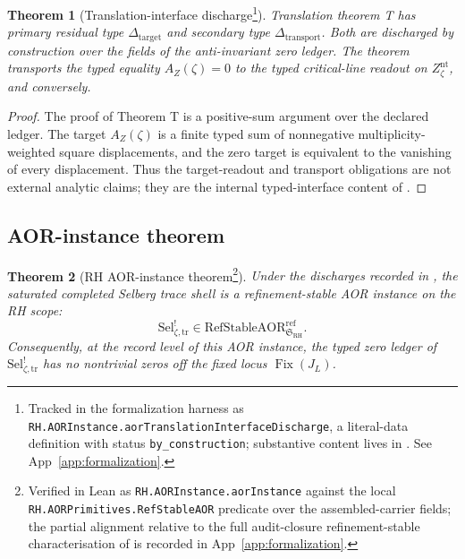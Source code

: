 \documentclass[11pt]{article}
\DeclareMathOperator{\Fix}{Fix}
\newcommand{\JL}{J_{L}}
\newcommand{\Znt}{Z_{\zeta}^{\mathrm{nt}}}
\newcommand{\AZ}{A_{Z}(\zeta)}
\newcommand{\Sel}{\mathrm{Sel}^{!}_{\zeta,\mathrm{tr}}}
\newtheorem{theorem}{Theorem}[section]
\theoremstyle{definition}
\begin{document}
\begin{theorem}[Translation-interface discharge\footnote{Tracked in the formalization harness as \nolinkurl{RH.AORInstance.aorTranslationInterfaceDischarge}, a literal-data definition with status \texttt{by\_construction}; substantive content lives in . See App~\ref{app:formalization}.}]
\label{thm:rh:aor-translation-interface-discharge}
Translation theorem T has primary residual type
\(\Delta_{\mathrm{target}}\) and secondary type
\(\Delta_{\mathrm{transport}}\).  Both are discharged by construction
over the fields of the anti-invariant zero ledger.  The theorem
transports the typed equality \(\AZ=0\) to the typed critical-line
readout on \(\Znt\), and conversely.
\end{theorem}

\begin{proof}
The proof of Theorem T is a positive-sum argument over the declared
ledger.  The target \(\AZ\) is a finite typed sum of nonnegative
multiplicity-weighted square displacements, and the zero target is
equivalent to the vanishing of every displacement.  Thus the
target-readout and transport obligations are not external analytic
claims; they are the internal typed-interface content of
.
\end{proof}

\subsection{AOR-instance theorem}

\begin{theorem}[RH AOR-instance theorem\footnote{Verified in Lean as \nolinkurl{RH.AORInstance.aorInstance} against the local \nolinkurl{RH.AORPrimitives.RefStableAOR} predicate over the assembled-carrier fields; the partial alignment relative to the full audit-closure refinement-stable characterisation of \citet{TsiokosAOR2026} is recorded in App~\ref{app:formalization}.}]
\label{thm:rh:aor-instance}
Under the discharges recorded in
, the saturated completed
Selberg trace shell is a refinement-stable AOR instance on the RH
scope:
\[
  \Sel\in
  \mathrm{RefStableAOR}^{\mathrm{ref}}_{\mathfrak S_{\mathrm{RH}}}.
\]
Consequently, at the record level of this AOR instance, the typed zero
ledger of \(\Sel\) has no nontrivial zeros off the fixed locus
\(\Fix(\JL)\).
\end{theorem}
\end{document}

